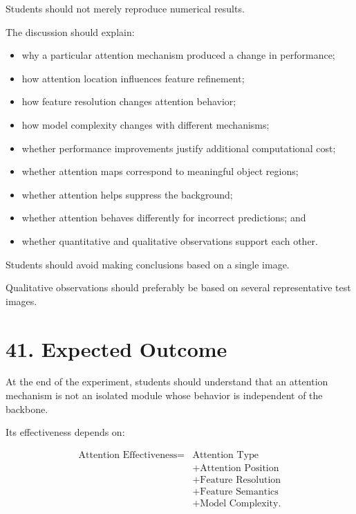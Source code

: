 \documentclass[10pt]{article}
\begin{document}
Students should not merely reproduce numerical results.

The discussion should explain:

\begin{itemize}

\item why a particular attention mechanism produced a change in performance;

\item how attention location influences feature refinement;

\item how feature resolution changes attention behavior;

\item how model complexity changes with different mechanisms;

\item whether performance improvements justify additional computational cost;

\item whether attention maps correspond to meaningful object regions;

\item whether attention helps suppress the background;

\item whether attention behaves differently for incorrect predictions; and

\item whether quantitative and qualitative observations support each other.

\end{itemize}

Students should avoid making conclusions based on a single image.

Qualitative observations should preferably be based on several representative
test images.

\section*{41. Expected Outcome}

At the end of the experiment, students should understand that an attention
mechanism is not an isolated module whose behavior is independent of the
backbone.

Its effectiveness depends on:

\[
\boxed{
\begin{aligned}
\text{Attention Effectiveness}
={}&
\text{Attention Type}\\
&+
\text{Attention Position}\\
&+
\text{Feature Resolution}\\
&+
\text{Feature Semantics}\\
&+
\text{Model Complexity}.
\end{aligned}
}
\]
\end{document}

